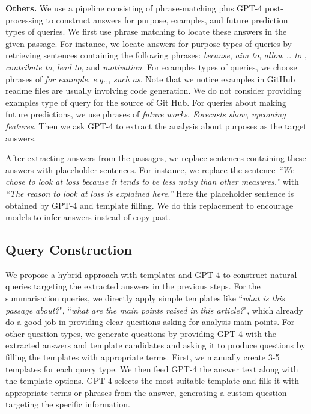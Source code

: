 \documentclass[letterpaper]{article} %
\begin{document}
\noindent\textbf{Others.} We use a pipeline consisting of phrase-matching plus GPT-4 post-processing to construct answers for purpose, examples, and future prediction types of queries. We first use phrase matching to locate these answers in the given passage. For instance, we locate answers for purpose types of queries by retrieving sentences containing the following phrases: \textit{because}, \textit{aim to}, \textit{allow .. to }, \textit{contribute to}, \textit{lead to}, and \textit{motivation}. For examples types of queries, we choose phrases of \textit{for example}, \textit{e.g.,}, \textit{such as}. Note that we notice examples in GitHub readme files are usually involving code generation. We do not consider providing examples type of query for the source of Git Hub. For queries about making future predictions, we use phrases of \textit{future works}, \textit{Forecasts show}, \textit{upcoming features}. Then we ask GPT-4 to extract the analysis about purposes as the target answers.

After extracting answers from the passages, we replace sentences containing these answers with placeholder sentences. For instance, we replace the sentence \textit{``We chose to look at loss because it tends to be less noisy than other measures.''} with \textit{``The reason to look at loss is explained here.''} Here the placeholder sentence is obtained by GPT-4 and template filling. We do this replacement to encourage models to infer answers instead of copy-past.

\subsection{Query Construction}

We propose a hybrid approach with templates and GPT-4 to construct natural queries targeting the extracted answers in the previous steps.
For the summarisation queries, we directly apply simple templates like ``\textit{what is this passage about?}", ``\textit{what are the main points raised in this article?}", which already do a good job in providing clear questions asking for analysis main points. For other question types, we generate questions by providing GPT-4 with the extracted answers and template candidates and asking it to produce questions by filling the templates with appropriate terms. First, we manually create 3-5 templates for each query type. We then feed GPT-4 the answer text along with the template options. GPT-4 selects the most suitable template and fills it with appropriate terms or phrases from the answer, generating a custom question targeting the specific information. 
\end{document}
